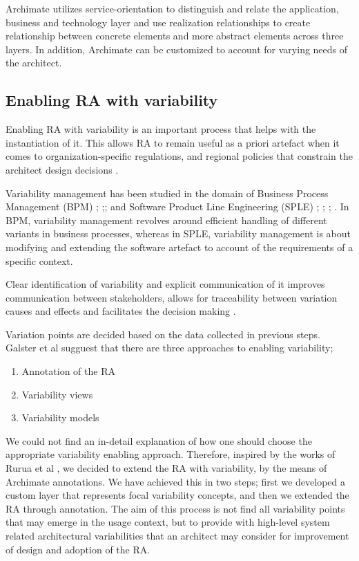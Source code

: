 \documentclass[review]{elsarticle}
\begin{document}
Archimate utilizes service-orientation to distinguish and relate the application, business and technology layer and use realization relationships to create relationship between concrete elements and more abstract elements across three layers. In addition, Archimate can be customized to account for varying needs of the architect.

\subsection{Enabling RA with variability}

Enabling RA with variability is an important process that helps with the instantiation of it.
This allows RA to remain useful as a priori artefact when it comes to organization-specific regulations, and regional policies that constrain the architect design decisions \cite{rurua2019representing}.

Variability management has been studied in the domain of Business Process Management (BPM) \cite{la2009questionnaire}; ;\cite{rosemann2007configurable}; \cite{hallerbach2010capturing} and Software Product Line Engineering (SPLE) \cite{pohl2005software}\cite{chen2011systematic}; \cite{schmid2004customizable}; \cite{svahnberg2005taxonomy}; \cite{sinnema2006covamof}. In BPM, variability management revolves around efficient handling of different variants in business processes, whereas in SPLE, variability management is about modifying and extending the software artefact to account of the requirements of a specific context.

Clear identification of variability and explicit communication of it improves communication between stakeholders, allows for traceability between variation causes and effects and facilitates the decision making \cite{czarnecki2012cool}.

Variation points are decided based on the data collected in previous steps. Galster et al \cite{galster2011empirically} sugguest that there are three approaches to enabling variability;

\begin{enumerate}
    \item Annotation of the RA
    \item Variability views
    \item Variability models
\end{enumerate}

We could not find an in-detail explanation of how one should choose the appropriate variability enabling approach. Therefore, inspired by the works of Rurua et al \cite{rurua2019representing}, we decided to extend the RA with variability, by the means of Archimate annotations. We have achieved this in two steps; first we developed a custom layer that represents focal variability concepts, and then we extended the RA through annotation. The aim of this process is not find all variability points that may emerge in the usage context, but to provide with high-level system related architectural variabilities that an architect may consider for improvement of design and adoption of the RA.
\end{document}
